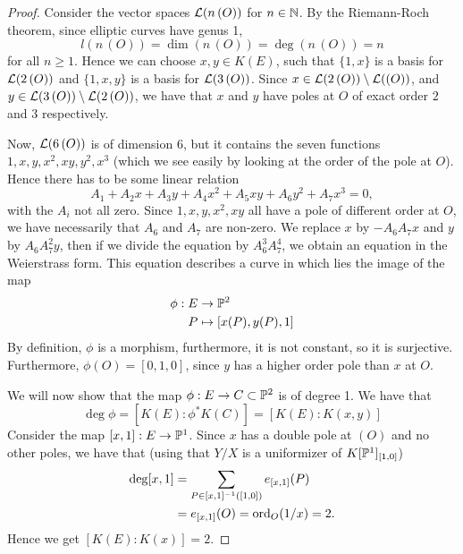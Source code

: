 \begin{proof}
	Consider the vector spaces $\mathcal{L}(n\,(O))$ for $n \in \mathbb{N}$.
	By the Riemann-Roch theorem, since elliptic curves have genus 1,
	\begin{equation*}
		l(n\,(O)) = \dim(n\,(O)) = \deg(n\,(O)) = n
	\end{equation*}
	for all $n \geq 1$. Hence we can choose $x, y \in K(E)$, such that
	$\{1, x\}$ is a basis for $\mathcal{L}(2\,(O))$ and $\{1, x, y\}$
	is a basis for $\mathcal{L}(3\,(O))$.
	Since $x \in \mathcal{L}(2\,(O))\setminus\mathcal{L}((O))$, 
	and $y \in \mathcal{L}(3\,(O))\setminus\mathcal{L}(2\,(O))$, we have that
	$x$ and $y$ have poles at $O$ of exact order $2$ and $3$
	respectively.
	
	Now, $\mathcal{L}(6\,(O))$ is of dimension $6$, but it contains the seven
	functions $1, x, y, x^2, xy, y^2, x^3$ (which we see easily by
	looking at the order of the pole at $O$). Hence there has to be some
	linear relation
	\begin{equation*}
		A_1 + A_2x + A_3y + A_4x^2 + A_5xy + A_6y^2 + A_7x^3 = 0,
	\end{equation*}
	with the $A_i$ not all zero.
	Since $1, x, y, x^2, xy$ all have a pole of different order at $O$,
	we have necessarily that $A_6$ and $A_7$ are non-zero.
	We replace $x$ by $-A_6A_7x$ and $y$ by $A_6A_7^2y$, then if we divide 
	the equation by $A_6^3A_7^4$, we obtain an equation in the Weierstrass
	form. This equation describes a curve in which lies the image of the map
	\begin{align*}
		\phi:E &\to \mathbb{P}^2\\
		P &\mapsto [x(P), y(P), 1]
	\end{align*}
	By definition, $\phi$ is a morphism, furthermore, it is not constant,
	so it is surjective. Furthermore, $\phi(O) = [0, 1, 0]$, since
	$y$ has a higher order pole than $x$ at $O$.

	We will now show that the map $\phi: E\to C\subset \mathbb{P}^2$ is of degree 1.
	We have that
	\begin{equation*}
		\deg\phi = [K(E): \phi^*K(C)] = [K(E): K(x, y)]
	\end{equation*}
	Consider the map $[x, 1]: E \to \mathbb{P}^1$. Since $x$ has a double pole
	at $(O)$ and no other poles, we have that (using that
	$Y/X$ is a uniformizer of $K[\mathbb{P}^1]_{[1, 0]}$)
	\begin{align*}
		\deg[x, 1] &= \sum_{P \in [x, 1]^{-1}([1, 0])}
		e_{[x, 1]}(P)\\
		&= e_{[x, 1]}(O)
		= \operatorname{ord}_O(1/x) = 2.
	\end{align*}
	Hence we get $[K(E): K(x)] = 2$.
	

\end{proof}
